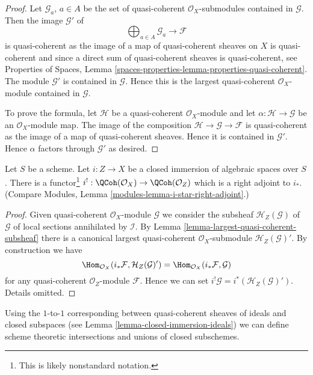 \begin{proof}
Let $\mathcal{G}_a$, $a \in A$ be the set of quasi-coherent
$\mathcal{O}_X$-submodules contained in $\mathcal{G}$.
Then the image $\mathcal{G}'$ of
$$
\bigoplus\nolimits_{a \in A} \mathcal{G}_a \longrightarrow \mathcal{F}
$$
is quasi-coherent as the image of a map of quasi-coherent sheaves
on $X$ is quasi-coherent and since a direct sum of quasi-coherent sheaves
is quasi-coherent, see
Properties of Spaces,
Lemma \ref{spaces-properties-lemma-properties-quasi-coherent}.
The module $\mathcal{G}'$ is contained in $\mathcal{G}$. Hence this is the
largest quasi-coherent $\mathcal{O}_X$-module contained in $\mathcal{G}$.

\medskip\noindent
To prove the formula, let $\mathcal{H}$ be a quasi-coherent
$\mathcal{O}_X$-module and let $\alpha : \mathcal{H} \to \mathcal{G}$
be an $\mathcal{O}_X$-module map. The image of the composition
$\mathcal{H} \to \mathcal{G} \to \mathcal{F}$ is quasi-coherent
as the image of a map of quasi-coherent sheaves. Hence it is contained
in $\mathcal{G}'$. Hence $\alpha$ factors through $\mathcal{G}'$
as desired.
\end{proof}

\begin{lemma}
\label{lemma-i-upper-shriek}
Let $S$ be a scheme.
Let $i : Z \to X$ be a closed immersion of algebraic spaces over $S$.
There is a functor\footnote{This is likely nonstandard notation.}
$i^! : \QCoh(\mathcal{O}_X) \to \QCoh(\mathcal{O}_Z)$
which is a right adjoint to $i_*$. (Compare
Modules, Lemma \ref{modules-lemma-i-star-right-adjoint}.)
\end{lemma}

\begin{proof}
Given quasi-coherent $\mathcal{O}_X$-module $\mathcal{G}$ we consider
the subsheaf $\mathcal{H}_Z(\mathcal{G})$ of $\mathcal{G}$ of local sections
annihilated by $\mathcal{I}$. By
Lemma \ref{lemma-largest-quasi-coherent-subsheaf}
there is a canonical largest quasi-coherent $\mathcal{O}_X$-submodule
$\mathcal{H}_Z(\mathcal{G})'$. By construction we have
$$
\Hom_{\mathcal{O}_X}(i_*\mathcal{F}, \mathcal{H}_Z(\mathcal{G})')
=
\Hom_{\mathcal{O}_X}(i_*\mathcal{F}, \mathcal{G})
$$
for any quasi-coherent $\mathcal{O}_Z$-module $\mathcal{F}$.
Hence we can set $i^!\mathcal{G} = i^*(\mathcal{H}_Z(\mathcal{G})')$.
Details omitted.
\end{proof}

\noindent
Using the $1$-to-$1$ corresponding between quasi-coherent sheaves
of ideals and closed subspaces (see
Lemma \ref{lemma-closed-immersion-ideals})
we can define scheme theoretic intersections and unions
of closed subschemes.

